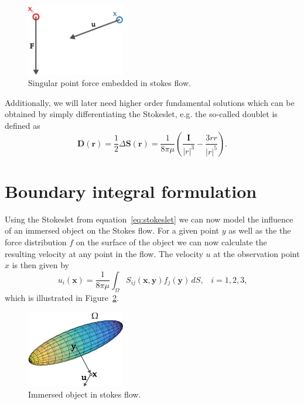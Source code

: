 \documentclass[a4paper,11pt]{kth-mag}
\begin{document}
\begin{figure}[!htbp]
  \centering
  \includegraphics[width=0.3819660112501450000000\textwidth]{img/stokeslet.pdf}
  \caption{Singular point force embedded in stokes flow.}
  \label{fig:stokeslet}
\end{figure}

Additionally, we will later need higher order fundamental solutions which can be obtained by simply differentiating the Stokeslet, e.g. the so-called doublet is defined as
\begin{equation}
  \label{eq:doublet}
  \mathbf{D}(\mathbf{r}) = \frac{1}{2} \Delta\mathbf{S}(\mathbf{r}) = \frac{1}{8\pi\mu} \left(\frac{\mathbf{I}}{|r|^3} - \frac{3rr}{|r|^5}\right) \text{.}
\end{equation}

\section{Boundary integral formulation}

Using the Stokeslet from equation~\eqref{eq:stokeslet} we can now model the influence of an immersed object on the Stokes flow. For a given point $y$ as well as the the force distribution $f$ on the surface of the object we can now calculate the resulting velocity at any point in the flow. The velocity $u$ at the observation point $x$ is then given by
\begin{equation}
  \label{eq:boundary_integral_formulation}
  u_i(\mathbf{x}) = \frac{1}{8\pi\mu}\int_{\Omega}S_{ij}(\mathbf{x},\mathbf{y})f_j(\mathbf{y}) \, dS \text{,} \quad i=1,2,3\text{,}
\end{equation}
which is illustrated in Figure~\ref{fig:immersed}.

\begin{figure}[!htbp]
  \centering
  \includegraphics[width=0.3819660112501450000000\textwidth]{img/immersed.pdf}
  \caption{Immersed object in stokes flow.}
  \label{fig:immersed}
\end{figure}
\end{document}
